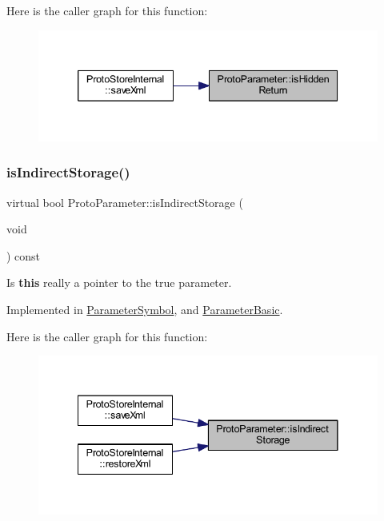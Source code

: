 Here is the caller graph for this function\+:
\nopagebreak
\begin{figure}[H]
\begin{center}
\leavevmode
\includegraphics[width=339pt]{class_proto_parameter_a104c1c7a9873fafe0394d23bb35feeb4_icgraph}
\end{center}
\end{figure}
\mbox{\label{class_proto_parameter_a07008f520e34c236298de7f652c22657}} 
\subsubsection{\texorpdfstring{isIndirectStorage()}{isIndirectStorage()}}
{\footnotesize\ttfamily virtual bool Proto\+Parameter\+::is\+Indirect\+Storage (\begin{DoxyParamCaption}\item[{void}]{ }\end{DoxyParamCaption}) const\hspace{0.3cm}{\ttfamily [pure virtual]}}



Is {\bfseries{this}} really a pointer to the true parameter. 



Implemented in \mbox{\hyperlink{class_parameter_symbol_a664deaea278dd7353fe391f94233cfd0}{Parameter\+Symbol}}, and \mbox{\hyperlink{class_parameter_basic_a9f09a6b3c75b4a3161b789fda98edc4a}{Parameter\+Basic}}.

Here is the caller graph for this function\+:
\nopagebreak
\begin{figure}[H]
\begin{center}
\leavevmode
\includegraphics[width=341pt]{class_proto_parameter_a07008f520e34c236298de7f652c22657_icgraph}
\end{center}
\end{figure}
\mbox{\label{class_proto_parameter_ae8d61607d66c96ac0fc9e0e6b7a100f1}} 
